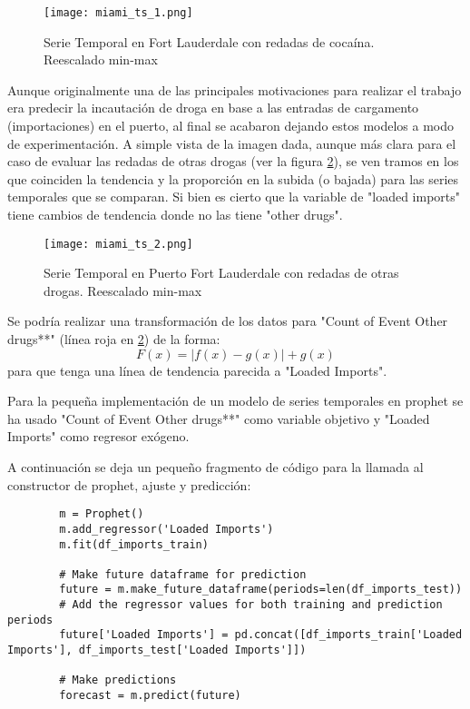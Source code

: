 \documentclass[12pt]{article}
\begin{document}
	\begin{figure}[H]
		\caption{\label{miami_ts_1} Serie Temporal en Fort Lauderdale con redadas de cocaína. Reescalado min-max}
		\centering
		\hspace*{1cm}
		\texttt{[image: miami\_ts\_1.png]}
	\end{figure}

	Aunque originalmente una de las principales motivaciones para realizar el trabajo era predecir la incautación de droga en base a las entradas de cargamento (importaciones) en el puerto, al final se acabaron dejando estos modelos a modo de experimentación. A simple vista de la imagen dada, aunque más clara para el caso de evaluar las redadas de otras drogas (ver la figura \ref{miami_ts_2}), se ven tramos en los que coinciden la tendencia y la proporción en la subida (o bajada) para las series temporales que se comparan. Si bien es cierto que la variable de "loaded imports" tiene cambios de tendencia donde no las tiene "other drugs".
	
	\begin{figure}[H]
		\caption{\label{miami_ts_2} Serie Temporal en Puerto Fort Lauderdale con redadas de otras drogas. Reescalado min-max}
		\centering
		\hspace*{1cm}
		\texttt{[image: miami\_ts\_2.png]}
	\end{figure}

	Se podría realizar una transformación de los datos para "Count of Event Other drugs**" (línea roja en \ref{miami_ts_2}) de la forma:
	$$F(x) = |f(x) - g(x)| + g(x)$$
	para que tenga una línea de tendencia parecida a "Loaded Imports".
	
	Para la pequeña implementación de un modelo de series temporales en prophet se ha usado "Count of Event Other drugs**" como variable objetivo y "Loaded Imports" como regresor exógeno.
	
	A continuación se deja un pequeño fragmento de código para la llamada al constructor de prophet, ajuste y predicción:
	\begin{verbatim}
		m = Prophet()
		m.add_regressor('Loaded Imports')
		m.fit(df_imports_train)
		
		# Make future dataframe for prediction
		future = m.make_future_dataframe(periods=len(df_imports_test))
		# Add the regressor values for both training and prediction periods
		future['Loaded Imports'] = pd.concat([df_imports_train['Loaded Imports'], df_imports_test['Loaded Imports']])
		
		# Make predictions
		forecast = m.predict(future)
	\end{verbatim}
\end{document}
